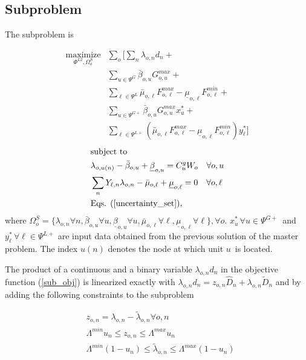 \subsection{Subproblem}

The subproblem is

\begin{align}
\label{sub_obj} \underset{\Phi^{L2}, \Omega_o^{S}}{\text{maximize}} &\sum\limits_o \Bigg[ \sum\limits_n \lambda_{o, n} d_n + \nonumber \\
&\sum\limits_{u \in \Psi^G} \bar{\beta}_{o,u} G_{o,u}^{max} + \nonumber \\
&\sum\limits_{\ell \in \Psi^L} \bar{\mu}_{o,\ell} F_{o,\ell}^{max} - \underline{\mu}_{o,\ell} F_{o,\ell}^{min} + \nonumber \\
&\sum\limits_{u \in \Psi^{G+}} \bar{\beta}_{o,u} G_{o,u}^{max} x_u^* + \nonumber \\
&\sum\limits_{\ell \in \Psi^{L+}} \left( \bar{\mu}_{o,\ell} F_{o,\ell}^{max} - \underline{\mu}_{o,\ell} F_{o,\ell}^{min} \right) y_\ell^* \Bigg]
\end{align}
\begin{align}
&\text{subject to} \nonumber \\
&\lambda_{o, u(n)} - \bar{\beta}_{o,u} + \underline{\beta}_{o,u} = C^g_u  W_o \quad \forall o, u \\
&\sum\limits_n Y_{\ell, n} \lambda_{o, n} - \bar{\mu}_{o, \ell} + \underline{\mu}_{o, \ell} = 0 \quad \forall o, \ell \\
&\text{Eqs. } (\ref{uncertainty_set}),
\end{align}
where $\Omega^{S}_o = \{ \lambda_{o, n} \forall n, \bar{\beta}_{o,u} \forall u, \underline{\beta}_{o,u} \forall u, \bar{\mu}_{o,\ell} \forall \ell, \underline{\mu}_{o,\ell} \forall \ell \}, \forall o$. $x_u^* \, \forall u \in \Psi^{G+}$ and $y_\ell^* \, \forall \ell \in \Psi^{L+}$ are input data obtained from the previous solution of the master problem. The index $u(n)$ denotes the node at which unit $u$ is located.

The product of a continuous and a binary variable $\lambda_{o, n} d_n$ in the objective function (\ref{sub_obj}) is linearized exactly with $\lambda_{o, n} d_n = z_{o, n} \hat{D}_n + \lambda_{o, n} \tilde{D}_n$ and by adding the following constraints to the subproblem

\begin{align}
&z_{o,n} = \lambda_{o, n} - \tilde{\lambda}_{o, n} \forall o, n \\
&\Lambda^{min} u_n \leq z_{o, n} \leq \Lambda^{max} u_n \\
&\Lambda^{min} (1 - u_n) \leq \tilde{\lambda}_{o, n} \leq \Lambda^{max} (1 - u_n)
\end{align}


